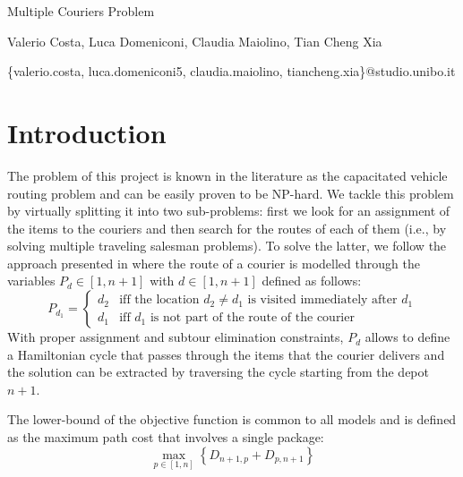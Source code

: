 \documentclass{article}
\begin{document}
    \begin{titlepage}
        \begin{center}
            {\LARGE Multiple Couriers Problem}
            \vspace*{1em}
            
            Valerio Costa, Luca Domeniconi, Claudia Maiolino, Tian Cheng Xia

            \centerline{\{valerio.costa, luca.domeniconi5, claudia.maiolino, tiancheng.xia\}@studio.unibo.it}
        \end{center}
    \end{titlepage}

    \thispagestyle{plain}

    \section{Introduction} \label{sec:intro}
    The problem of this project is known in the literature as the capacitated vehicle routing problem and can be easily proven to be NP-hard. We tackle this problem by virtually splitting it into two sub-problems: first we look for an assignment of the items to the couriers and then search for the routes of each of them (i.e., by solving multiple traveling salesman problems). To solve the latter, we follow the approach presented in \cite{vrp} where the route of a courier is modelled through the variables $P_d \in [1, n+1]$ with $d \in [1, n+1]$ defined as follows:
    \begin{equation}
        \label{eq:path_def}
        P_{d_1} = \begin{cases}
            d_2 & \text{iff the location $d_2 \neq d_1$ is visited immediately after $d_1$}\\
            d_1 & \text{iff $d_1$ is not part of the route of the courier}
        \end{cases}
    \end{equation} 
    With proper assignment and subtour elimination constraints, $P_d$ allows to define a Hamiltonian cycle that passes through the items that the courier delivers and the solution can be extracted by traversing the cycle starting from the depot $n+1$.

    The lower-bound of the objective function is common to all models and is defined as the maximum path cost that involves a single package:
    \begin{equation}
        \max_{p \in [1, n]} \left\{ D_{n+1, p} + D_{p, n+1} \right\}
    \end{equation}
\end{document}
